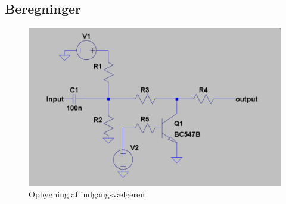 \subsection*{Beregninger}

\begin{figure}[h]
\centering
\includegraphics[scale=0.4]{implementering/indgangsvaelger/signal-taend-sluk.png}
\caption{Opbygning af indgangsvælgeren}
\label{indgangsvaelger-overordnet}
\end{figure}

